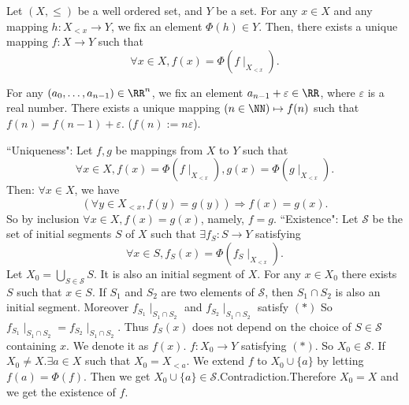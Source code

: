 \begin{theoremenv}
    Let $(X, \le)$ be a well ordered set,  and $Y$ be a set. For any $x\in X$ and any mapping $h:X_{<x}\rightarrow Y$,  we fix an element $\Phi(h)\in Y$. Then,  there exists a unique mapping $f:X\rightarrow Y$  such that 
    $$\forall x\in X,  f(x)=\Phi(f\mid_{X_{<x}}).$$
\end{theoremenv}
\begin{exampleenv}
    For any $(a_0, \dots, a_{n-1})\in \RR^n$,  we fix an element $a_{n-1}+\varepsilon\in \RR$,  where $\varepsilon$ is a real number. There exists a unique mapping $(n\in \NN)\mapsto f(n)$ such that $f(n)=f(n-1)+\varepsilon$. ($f(n):=n\varepsilon$).
\end{exampleenv}
\begin{proofenv}
    \quad
    \newline
    ``Uniqueness": 
    \newline
    Let $f, g$ be mappings from $X$ to $Y$ such that 
    $$\forall x\in X, f(x)=\Phi(f\mid_{X_{<x}}), g(x)=\Phi(g\mid_{X_{<x}}).$$
    Then: $\forall x\in X$,  we have 
    $$(\forall y\in X_{<x}, f(y)=g(y))\Rightarrow f(x)=g(x).$$
    So by inclusion $\forall x \in X,  f(x)=g(x)$,  namely,  $f=g$.
    \newline
    ``Existence": 
    \newline
    Let $\mathscr{S}$  be the set of initial segments $S$ of $X$ such that $\exists f_S:S\rightarrow Y$ satisfying 
    \begin{equation*}
        \forall x\in S, f_S(x)=\Phi(f_S\mid_{X_{<x}}). \tag{$*$}
    \end{equation*}
    Let $X_0=\bigcup_{S\in\mathscr{S} }S$. It is also an initial segment of $X$. For any $x\in X_0$ there exists $ S $ such that $x\in S$. If $S_1$ and $S_2$ are two elements of $\mathscr{S}$,  then $S_1\cap S_2$ is also an initial segment. Moreover $f_{S_1}\mid_{S_1\cap S_2}$ and $f_{S_2}\mid_{S_1\cap S_2}$ satisfy $(*)$ So $f_{S_1}\mid_{S_1\cap S_2}=f_{S_2}\mid_{S_1\cap S_2}$. Thus $f_S(x)$ does not depend on the choice of $S\in \mathscr{S}$ containing $x$. We denote it as $f(x)$. $f:X_0\rightarrow Y$ satisfying $(*)$. So $X_0\in \mathscr{S}$.
    If $X_0\not=X.\exists a\in X$ such that $ X_0=X_{<a}$. We extend $f$ to $X_0\cup\{a\}$ by letting $f(a)=\Phi(f)$. Then we get $X_0\cup\{a\}\in \mathscr{S}$.Contradiction.Therefore $X_0=X$  and we get the existence of $f$. 
\end{proofenv}

